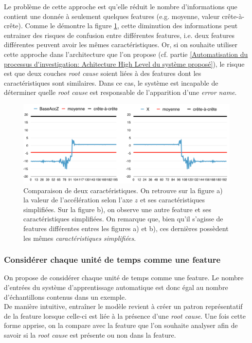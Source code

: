 Le problème de cette approche est qu'elle réduit le nombre d'informations que contient une donnée à seulement quelques features (e.g. moyenne, valeur crête-à-crête). Comme le démontre la figure \ref{fig:Comparaison de deux caractéristiques}, cette diminution des informations peut entrainer des risques de confusion entre différentes features, i.e. deux features différentes peuvent avoir les mêmes caractéristiques. Or, si on souhaite utiliser cette approche dans l'architecture que l'on propose (cf. partie \ref{Automatisation du processus d'investigation: Achitecture High Level du système proposé}), le risque est que deux couches \emph{root cause} soient liées à des features dont les caractéristiques sont similaires. Dans ce cas, le système est incapable de déterminer quelle \emph{root cause} est responsable de l'apparition d'une \emph{error name}.

\begin{figure}[h]
	\centering\includegraphics[width=15cm]{images/caracteristiques_simples_2.png}
	\caption[Comparaison de deux caractéristiques]{Comparaison de deux caractéristiques. On retrouve sur la figure a) la valeur de l'accélération selon l'axe $z$ et ses caractéristiques simplifiées. Sur la figure b), on observe une autre feature et ses caractéristiques simplifiées. On remarque que, bien qu'il s'agisse de features différentes entres les figures a) et b), ces dernières possèdent les mêmes \emph{caractéristiques simplifiées}.}
	\label{fig:Comparaison de deux caractéristiques}
\end{figure}

\subsubsection{Considérer chaque unité de temps comme une feature}
\label{Automatisation du processus d'investigation: Reconnaissance de motifs: Différentes approches étudiées: Considérer chaque unité de temps comme une feature}
On propose de considérer chaque unité de temps comme une feature. Le nombre d'entrées du système d'apprentissage automatique est donc égal au nombre d'échantillons contenus dans un exemple. \\
De manière intuitive, entraîner le modèle revient à créer un patron représentatif de la feature lorsque celle-ci est liée à la présence d'une \emph{root cause}. Une fois cette forme apprise, on la compare avec la feature que l'on souhaite analyser afin de savoir si la \emph{root cause} est présente ou non dans la feature.
\newline

